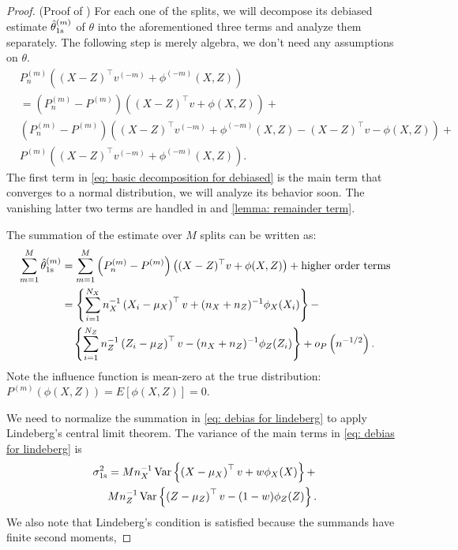 \documentclass[11pt]{article}
\begin{document}
\begin{proof}(Proof of )
For each one of the splits, we will decompose its debiased estimate $\hat \theta_{\rm 1s}^{(m)}$ of $\theta$ into the aforementioned three terms and analyze them separately. The following step is merely algebra, we don't need any assumptions on $\theta$.
    \begin{equation}
    \label{eq: basic decomposition for debiased}
    \begin{aligned}
      & P_n^{(m)}\left((X-Z)^{\top} v^{(-m)}+\phi^{(-m)}(X, Z)\right)  \\
      &  = (P_n^{(m)} - P^{(m)})((X-Z)^{\top} v+\phi (X, Z)) +\\
      &  (P_n^{(m)} - P^{(m)})\left((X-Z)^{\top} v^{(-m)}+\phi^{(-m)}(X, Z) - (X-Z)^{\top} v -\phi (X, Z)\right) + \\
      &  P^{(m)}\left((X-Z)^{\top} v^{(-m)}+\phi^{(-m)}(X, Z)\right).
    \end{aligned}
\end{equation}
The first term in \eqref{eq: basic decomposition for debiased} is the main term that converges to a normal distribution, we will analyze its behavior soon. The vanishing latter two terms are handled in  and \ref{lemma: remainder term}. 

The summation of the estimate over $M$ splits can be written as:
\begin{equation}
\label{eq: debias for lindeberg}
\begin{aligned}
\sum_{m=1}^{M} \hat \theta_{\rm 1s}^{(m)}
      & = \sum_{m=1}^M
\left(P_n^{(m)}-P^{(m)}\right)\left((X-Z)^{\top} v+\phi(X, Z)\right) + \text{higher order terms}\\
& = \left\{\sum_{i=1}^{N_X}
n_X^{-1}\left(X_i-\mu_X\right)^{\top} v + 
(n_X+n_Z)^{-1}\phi_X(X_i) \right\}-\\
& \quad \left\{\sum_{i=1}^{N_Z}
n_Z^{-1}\left(Z_i-\mu_Z\right)^{\top} v - 
(n_X+n_Z)^{-1}\phi_Z(Z_i)\right\}+ o_P\left(n^{-1 / 2}\right).
\end{aligned}
\end{equation}
Note the influence function is mean-zero at the true distribution: $P^{(m)}(\phi(X,Z)) = E[\phi(X,Z)] = 0$.

We need to normalize the summation in \eqref{eq: debias for lindeberg} to apply Lindeberg's central limit theorem. The variance of the main terms in \eqref{eq: debias for lindeberg} is
\begin{equation}
\label{eq: debias lindeberg variance}
\begin{aligned}
    \sigma^2_{\rm 1s} & = M n_X^{-1} \operatorname{Var}\left\{\left(X-\mu_X\right)^{\top} v+w\phi_X(X)\right\}+ \\
    & M n_Z^{-1} \operatorname{Var}\left\{\left(Z-\mu_Z\right)^{\top} v - (1-w) \phi_Z(Z)\right\}.
\end{aligned}
\end{equation}
We also note that Lindeberg's condition is satisfied because the summands have finite second moments,


\end{proof}
\end{document}
